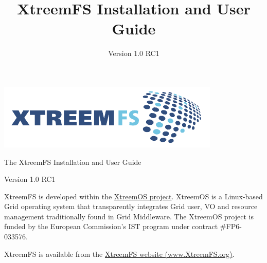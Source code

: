 \documentclass[a4paper,10pt]{book}
\title{XtreemFS Installation and User Guide}
\date{Version 1.0 RC1}
\begin{document}
\begin{titlepage}
\begin{flushright}
 \includegraphics{images/final_logo.pdf}
\end{flushright}

\vspace{3cm}

\begin{flushleft}
\sffamily \begin{LARGE}The XtreemFS Installation and User Guide\end{LARGE}

 Version 1.0 RC1
\end{flushleft}


\end{titlepage}
\garamond
{}

XtreemFS is developed within the \href{http://www.xtreemos.eu}{XtreemOS project}. XtreemOS is a Linux-based Grid operating system that transparently integrates Grid user, VO and resource management traditionally found in Grid Middleware. The XtreemOS project is funded by the European Commission's IST program under contract \#FP6-033576.

XtreemFS is available from the \href{http://www.XtreemFS.org}{XtreemFS website (www.XtreemFS.org)}.
\end{document}
